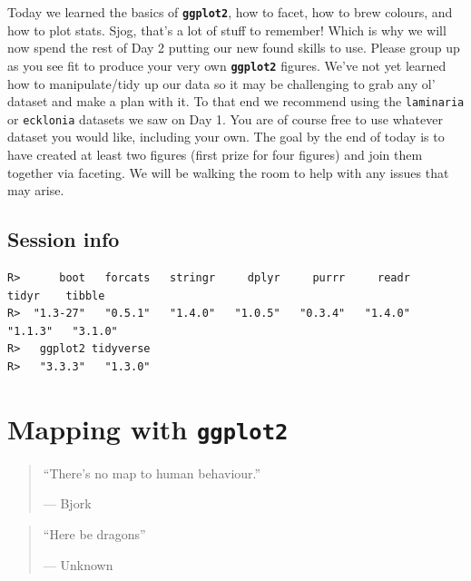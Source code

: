 \documentclass[
]{book}
\newenvironment{Shaded}{\begin{snugshade}}{\end{snugshade}}
\newcommand{\FunctionTok}[1]{\textcolor[rgb]{0.00,0.00,0.00}{#1}}
\newcommand{\NormalTok}[1]{#1}
\newcommand{\SpecialCharTok}[1]{\textcolor[rgb]{0.00,0.00,0.00}{#1}}
\newcommand{\StringTok}[1]{\textcolor[rgb]{0.31,0.60,0.02}{#1}}
\begin{document}
Today we learned the basics of \textbf{\texttt{ggplot2}}, how to facet, how to brew colours, and how to plot stats. Sjog, that's a lot of stuff to remember! Which is why we will now spend the rest of Day 2 putting our new found skills to use. Please group up as you see fit to produce your very own \textbf{\texttt{ggplot2}} figures. We've not yet learned how to manipulate/tidy up our data so it may be challenging to grab any ol' dataset and make a plan with it. To that end we recommend using the \texttt{laminaria} or \texttt{ecklonia} datasets we saw on Day 1. You are of course free to use whatever dataset you would like, including your own. The goal by the end of today is to have created at least two figures (first prize for four figures) and join them together via faceting. We will be walking the room to help with any issues that may arise.

\hypertarget{session-info-5}{%
\section{Session info}\label{session-info-5}}

\begin{Shaded}
\end{Shaded}

\begin{verbatim}
R>      boot   forcats   stringr     dplyr     purrr     readr     tidyr    tibble 
R>  "1.3-27"   "0.5.1"   "1.4.0"   "1.0.5"   "0.3.4"   "1.4.0"   "1.1.3"   "3.1.0" 
R>   ggplot2 tidyverse 
R>   "3.3.3"   "1.3.0"
\end{verbatim}

\hypertarget{mapping}{%
\chapter{\texorpdfstring{Mapping with \textbf{\texttt{ggplot2}}}{Mapping with ggplot2}}\label{mapping}}

\begin{quote}
``There's no map to human behaviour.''

--- Bjork
\end{quote}

\begin{quote}
``Here be dragons''

--- Unknown
\end{quote}
\end{document}
